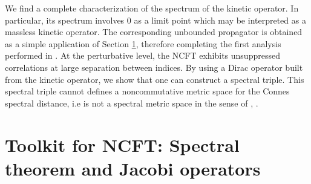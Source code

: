\documentclass[a4paper,11pt,twoside]{article}
\numberwithin{equation}{section}
\theoremstyle{nonumberplain}
\begin{document}
We find a complete characterization of the spectrum of the kinetic operator. In particular, its spectrum involves $0$ as a limit point which may be interpreted as a massless kinetic operator. The corresponding unbounded propagator is obtained as a simple application of Section \ref{subsection21}, therefore completing the first analysis performed in \cite{MVW13}.  At the perturbative level, the NCFT exhibits unsuppressed correlations at large separation between indices. By using a Dirac operator built from the kinetic operator, we show that one can construct a spectral triple. This spectral triple cannot defines a noncommutative metric space for the Connes spectral distance, i.e is not a spectral metric space in the sense of \cite{homot-moyal}, \cite{bel-mar}.


\section{Toolkit for NCFT: Spectral theorem and Jacobi operators}\label{subsection21}
\end{document}
